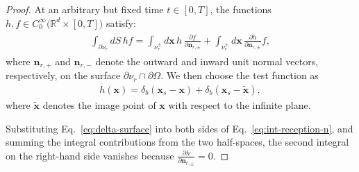 \documentclass[10pt,a4paper]{amsart}
\newcommand{\bn}{\boldsymbol{n}}
\newcommand{\btx}{\tilde{\bx}}
\newcommand{\bx}{\boldsymbol{x}}
\begin{document}
\begin{proof}
At an arbitrary but fixed time \( t \in [0,T] \), the functions \( h, f \in C_0^{\infty} \big( \mathbb{R}^d \times [0,T] \big) \) satisfy:
\begin{align}  \label{eq:int-reception-n}
\begin{split}
     \int_{\partial \nu_r} dS \, h  f = \int_{ \nu_r^\pm} d\bx \, h \, \frac{\partial f}{\partial \bn_{r,\pm}} + \int_{\nu_r^\pm} d\bx \, \frac{\partial h}{\partial \bn_{r,\pm}}  f,
\end{split}
\end{align}
where $\bn_{r,+}$ and $\bn_{r,-}$ denote the outward and inward unit normal vectors, respectively, on the surface $\partial \nu_r \cap \partial \Omega$. We then choose the test function as
\begin{align}  \label{eq:delta-surface}
h(\bx) = \delta_b(\bx_s - \bx) +  \delta_b(\bx_s - \btx),
\end{align}
where \(\btx\) denotes the image point of \(\bx\) with respect to the infinite plane.

\noindent
Substituting Eq.~\eqref{eq:delta-surface} into both sides of 
Eq.~\eqref{eq:int-reception-n}, and summing the integral contributions from the two half-spaces, the second integral on the right-hand side vanishes because \(\tfrac{\partial h}{\partial \bn_{r,\pm}}=0 \). 



\end{proof}
\end{document}
